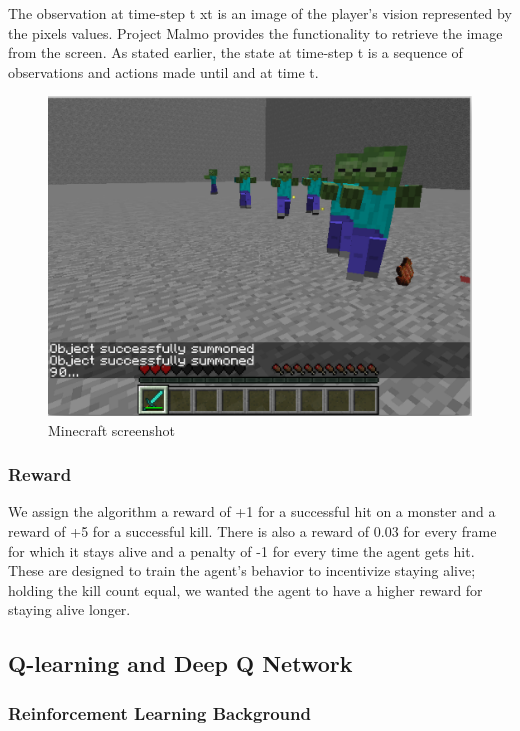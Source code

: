 \documentclass{article}
\begin{document}
\begin{multicols}{2}
The observation at time-step t xt is an image of the player's vision represented by the pixels values. Project Malmo provides the functionality to retrieve the image from the screen. As stated earlier, the state at time-step t is a sequence of observations and actions made until and at time t. 

\begin{figure}[H]
\caption{Minecraft screenshot}
\centering
\includegraphics[scale=0.3]{./hiro_screenshot.png}
\end{figure}



\subsubsection{Reward}

We assign the algorithm a reward of +1 for a successful hit on a monster and a reward of +5 for a successful kill.
There is also a reward of 0.03 for every frame for which it stays alive and a penalty of -1 for every time the agent gets hit. These are designed to train the agent's behavior to incentivize staying alive; holding the kill count equal, we wanted the agent to have a higher reward for staying alive longer.


\subsection{Q-learning and Deep Q Network}

\subsubsection{Reinforcement Learning Background}


\end{multicols}
\end{document}
